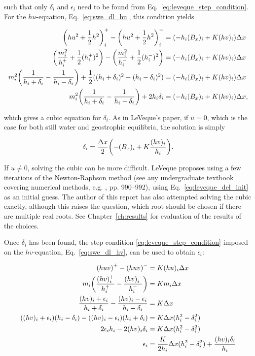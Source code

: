 such that only $\delta_i$ and $\epsilon_i$ need to be found from Eq.~\ref{eq:leveque_step_condition}. For the $hu$-equation, Eq.~\ref{eq:swe_dl_hu}, this condition yields

\begin{align}
  \qty(hu^2 + \frac{1}{2}h^2)_i^+ - \qty(hu^2 + \frac{1}{2}h^2)_i^- &= (- h_i (B_x)_i + K (hv)_i)\Delta x \\
  \qty(\frac{m_i^2}{h_i^+} + \frac{1}{2}(h_i^+)^2) - \qty(\frac{m_i^2}{h_i^-} + \frac{1}{2}(h_i^-)^2) &= (- h_i (B_x)_i + K (hv)_i)\Delta x \\
  m_i^2\qty(\frac{1}{h_i+\delta_i} - \frac{1}{h_i-\delta_i}) + \frac{1}{2} ((h_i+\delta_i)^2 - (h_i-\delta_i)^2) &= (- h_i (B_x)_i + K (hv)_i)\Delta x \\
  m_i^2\qty(\frac{1}{h_i+\delta_i} - \frac{1}{h_i-\delta_i}) + 2 h_i \delta_i &= (- h_i (B_x)_i + K (hv)_i)\Delta x,
\end{align}

which gives a cubic equation for $\delta_i$. As in LeVeque's paper, if $u = 0$, which is the case for both still water and geostrophic equilibria, the solution is simply

\begin{equation}
  \label{eq:leveque_del_init}
  \delta_i = \frac{\Delta x}{2} \qty(-(B_x)_i + K\frac{(hv)_i}{h_i}).
\end{equation}

If $u \neq 0$, solving the cubic can be more difficult. LeVeque proposes using a few iterations of the Newton-Raphson method (see any undergraduate textbook covering numerical methods, e.g. \citet{riley2006mathematical}, pp. 990--992), using Eq.~\ref{eq:leveque_del_init} as an initial guess. The author of this report has also attempted solving the cubic exactly, although this raises the question, which root should be chosen if there are multiple real roots. See Chapter~\ref{ch:results} for evaluation of the results of the choices.

Once $\delta_i$ has been found, the step condition \ref{eq:leveque_step_condition} imposed on the $hv$-equation, Eq.~\ref{eq:swe_dl_hv}, can be used to obtain $\epsilon_i$:

\begin{align}
  \qty(huv)^+ - \qty(huv)^- &= K(hu)_i\Delta x \\
  m_i\qty(\frac{(hv)_i^+}{h_i^+} - \frac{(hv)_i^-}{h_i^-}) &= K m_i \Delta x \\
  \frac{(hv)_i + \epsilon_i}{h_i + \delta_i} - \frac{(hv)_i - \epsilon_i}{h_i - \delta_i} &= K \Delta x \\
  ((hv)_i+\epsilon_i)(h_i-\delta_i) - ((hv)_i-\epsilon_i)(h_i+\delta_i) &= K\Delta x (h_i^2 - \delta_i^2) \\
  2\epsilon_i h_i - 2(hv)_i \delta_i &= K\Delta x (h_i^2 - \delta_i^2) \\
  \epsilon_i &= \frac{K}{2h_i} \Delta x(h_i^2 - \delta_i^2) + \frac{(hv)_i \delta_i}{h_i}
\end{align}

